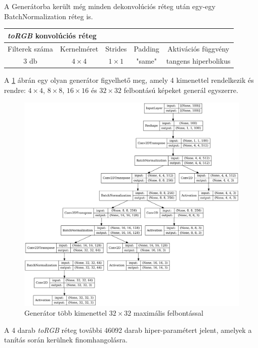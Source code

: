 A Generátorba került még minden dekonvolúciós réteg után egy-egy BatchNormalization réteg is.

\small{
\begin{center}
\begin{tabular}{ c|c|c|c|c }
	\multicolumn{5}{l}{\textbf{\textit{toRGB} konvolúciós réteg}} \\
	\hline
	Filterek száma & Kernelméret & Strides & Padding & Aktivációs függvény\\
	\hline
	3 db & $4 \times 4$ & $1 \times 1$ & "same" & tangens hiperbolikus\\
\end{tabular}
\end{center}
}

A \ref{fig:msgGenerator} ábrán egy olyan generátor figyelhető meg, amely 4 kimenettel rendelkezik és rendre: $4 \times 4$, $8 \times 8$, $16 \times 16$ és $32 \times 32$ felbontású képeket generál egyszerre.

\begin{figure}[h]
	\centering
	\includegraphics[width=15cm]{images/msgGenerator.png}
	\caption{Generátor több kimenettel $32 \times 32$ maximális felbontással}
	\label{fig:msgGenerator}
\end{figure}
A 4 darab \textit{toRGB} réteg további 46092 darab hiper-paramétert jelent, amelyek a tanítás során kerülnek finomhangolásra.

